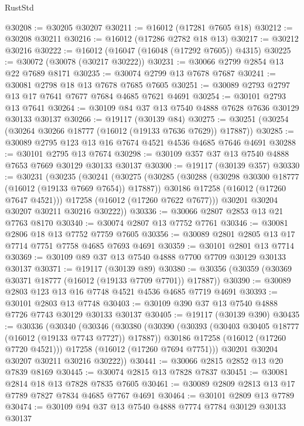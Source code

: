 \begin{lexlean}{RustStd}
\begin{coremodule}
@30208 := @30205 @30207
@30211 := @16012 (@17281 @7605 @18)
@30212 := @30208 @30211
@30216 := @16012 (@17286 @2782 @18 @13)
@30217 := @30212 @30216
@30222 := @16012 (@16047 (@16048 (@17292 @7605)) @4315)
@30225 := @30072 (@30078 (@30217 @30222))
@30231 := @30066 @2799 @2854 @13 @22 @7689 @8171
@30235 := @30074 @2799 @13 @7678 @7687
@30241 := @30081 @2798 @18 @13 @7678 @7685 @7605
@30251 := @30089 @2793 @2797 @13 @17 @7641 @7677 @7684 @4685 @7621 @4691
@30254 := @30101 @2793 @13 @7641
@30264 := @30109 @84 @37 @13 @7540 @4888 @7628 @7636 @30129 @30133 @30137
@30266 := @19117 (@30139 @84)
@30275 := @30251 (@30254 (@30264 @30266 @18777 (@16012 (@19133 @7636 @7629)) @17887))
@30285 := @30089 @2795 @123 @13 @16 @7674 @4521 @4536 @4685 @7646 @4691
@30288 := @30101 @2795 @13 @7674
@30298 := @30109 @357 @37 @13 @7540 @4888 @7653 @7669 @30129 @30133 @30137
@30300 := @19117 (@30139 @357)
@30330 := @30231
    (@30235
      (@30241
        (@30275
          (@30285
            (@30288 (@30298 @30300 @18777 (@16012 (@19133 @7669 @7654)) @17887))
            @30186
            @17258
            (@16012 (@17260 @7647 @4521)))
          @17258
          (@16012 (@17260 @7622 @7677)))
        @30201
        @30204
        @30207
        @30211
        @30216
        @30222))
@30336 := @30066 @2807 @2853 @13 @21 @7763 @8170
@30340 := @30074 @2807 @13 @7752 @7761
@30346 := @30081 @2806 @18 @13 @7752 @7759 @7605
@30356 := @30089 @2801 @2805 @13 @17 @7714 @7751 @7758 @4685 @7693 @4691
@30359 := @30101 @2801 @13 @7714
@30369 := @30109 @89 @37 @13 @7540 @4888 @7700 @7709 @30129 @30133 @30137
@30371 := @19117 (@30139 @89)
@30380 := @30356 (@30359 (@30369 @30371 @18777 (@16012 (@19133 @7709 @7701)) @17887))
@30390 := @30089 @2803 @123 @13 @16 @7748 @4521 @4536 @4685 @7719 @4691
@30393 := @30101 @2803 @13 @7748
@30403 := @30109 @390 @37 @13 @7540 @4888 @7726 @7743 @30129 @30133 @30137
@30405 := @19117 (@30139 @390)
@30435 := @30336
    (@30340
      (@30346
        (@30380
          (@30390
            (@30393 (@30403 @30405 @18777 (@16012 (@19133 @7743 @7727)) @17887))
            @30186
            @17258
            (@16012 (@17260 @7720 @4521)))
          @17258
          (@16012 (@17260 @7694 @7751)))
        @30201
        @30204
        @30207
        @30211
        @30216
        @30222))
@30441 := @30066 @2815 @2852 @13 @20 @7839 @8169
@30445 := @30074 @2815 @13 @7828 @7837
@30451 := @30081 @2814 @18 @13 @7828 @7835 @7605
@30461 := @30089 @2809 @2813 @13 @17 @7789 @7827 @7834 @4685 @7767 @4691
@30464 := @30101 @2809 @13 @7789
@30474 := @30109 @94 @37 @13 @7540 @4888 @7774 @7784 @30129 @30133 @30137

\end{coremodule}
\end{lexlean}
